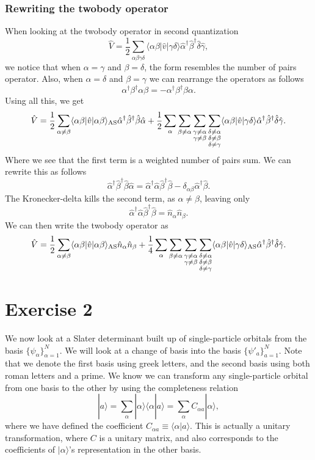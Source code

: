 \documentclass[a4paper, 11pt, notitlepage, english]{article}
\newcommand{\ket}[1]{|#1 \rangle}
\newcommand{\braket}[2]{\langle #1 | #2 \rangle}
\newcommand{\op}[1]{\hat{#1}}
\newcommand{\braopket}[3]{\langle #1 | {#2} | #3 \rangle}
\begin{document}
\subsubsection*{Rewriting the twobody operator}
When looking at the twobody operator in second quantization
$$\op{V} = \frac{1}{2}\sum_{\alpha\beta\gamma\delta}\braopket{\alpha\beta}{\op{v}}{\gamma\delta}\op{\alpha}^\dag\op{\beta}^\dag \op{\delta}\op{\gamma},$$
we notice that when $\alpha=\gamma$ and $\beta=\delta$, the form resembles the number of pairs operator. Also, when $\alpha=\delta$ and $\beta=\gamma$ we can rearrange the operators as follows
$$\alpha^\dagger\beta^\dagger\alpha \beta = -\alpha^\dagger\beta^\dagger \beta\alpha.$$
Using all this, we get
$$\op{V} = \frac{1}{2}\sum_{\alpha \neq \beta} \braopket{\alpha\beta}{\op{v}}{\alpha\beta}_{\rm AS}\op{\alpha}^\dag\op{\beta}^\dag\op{\beta}\op{\alpha} + \frac{1}{2}\sum_{\alpha}\sum_{\beta\neq\alpha}\sum_{\substack{\gamma\neq\alpha \\ \gamma \neq\beta}}\sum_{\substack{\delta\neq\alpha \\\delta\neq\beta\\ \delta \neq \gamma}} \braopket{\alpha\beta}{\op{v}}{\gamma\delta}\op{\alpha}^\dag\op{\beta}^\dag \op{\delta}\op{\gamma} .$$
Where we see that the first term is a weighted number of pairs sum. We can rewrite this as follows
$$\op{\alpha}^\dag\op{\beta}^\dag \op{\beta} \op{\alpha} = \op{\alpha}^\dag \op{\alpha}\op{\beta}^\dag\op{\beta} - \delta_{\alpha\beta}\op{\alpha}^\dag\op{\beta}.$$
The Kronecker-delta kills the second term, as $\alpha\neq\beta$, leaving only
$$\op{\alpha}^\dag\op{\alpha} \op{\beta}^\dag \op{\beta} = \op{n}_\alpha \op{n}_\beta.$$
We can then write the twobody operator as
$$\op{V} = \frac{1}{2}\sum_{\alpha \neq \beta} \braopket{\alpha\beta}{\op{v}}{\alpha\beta}_{\rm AS}\op{n}_\alpha \op{n}_\beta + \frac{1}{4}\sum_{\alpha}\sum_{\beta\neq\alpha}\sum_{\substack{\gamma\neq\alpha \\ \gamma \neq\beta}}\sum_{\substack{\delta\neq\alpha \\\delta\neq\beta\\ \delta \neq \gamma}} \braopket{\alpha\beta}{\op{v}}{\gamma\delta}_{\rm AS}\op{\alpha}^\dag\op{\beta}^\dag \op{\delta}\op{\gamma} .$$

\section*{Exercise 2}

We now look at a Slater determinant built up of single-particle orbitals from the basis $\{\psi_\alpha\}_{\alpha=1}^N$. We will look at a change of basis into the basis $\{\psi'_a\}_{a=1}^N$. Note that we denote the first basis using greek letters, and the second basis using both roman letters and a prime. We know we can transform any single-particle orbital from one basis to the other by using the completeness relation
$$\ket{a} = \sum_{\alpha} \ket{\alpha}\braket{\alpha}{a} = \sum_{\alpha} C_{\alpha a} \ket{\alpha},$$
where we have defined the coefficient $C_{\alpha a} \equiv \braket{\alpha}{a}$. This is actually a unitary transformation, where $C$ is a unitary matrix, and also corresponds to the coefficients of $\ket{\alpha}$'s representation in the other basis. 
\end{document}

